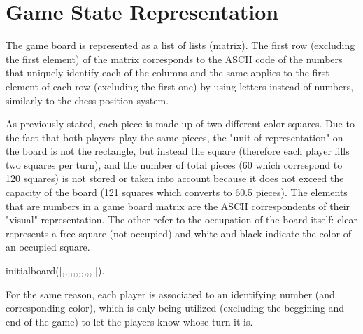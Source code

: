 \chapter{Game State Representation} \label{game-state-representation}

The game board is represented as a list of lists (matrix). The first row (excluding the first element) of the matrix corresponds to the ASCII code of the numbers that uniquely identify each of the columns and the same applies to the first element of each row (excluding the first one) by using letters instead of numbers, similarly to the chess position system.

As previously stated, each piece is made up of two different color squares.
Due to the fact that both players play the same pieces, the "unit of representation" on the board is not the rectangle, but instead the square (therefore each player fills two squares per turn), and the number of total pieces (60 which correspond to 120 squares) is not stored or taken into account because it does not exceed the capacity of the board (121 squares which converts to 60.5 pieces).
The elements that are numbers in a game board matrix are the ASCII correspondents of their "visual" representation. The other refer to the occupation of the board itself: clear represents a free square (not occupied) and white and black indicate the color of an occupied square.\newline

initial\textunderscore board([\newline
[clear,   48,   49,   50,   51,   52,   53,   54,   55,   56,   57,   58],,,,,,,,,,,\newline
]).\newline

For the same reason, each player is associated to an identifying number (and corresponding color), which is only being utilized (excluding the beggining and end of the game) to let the players know whose turn it is.


 